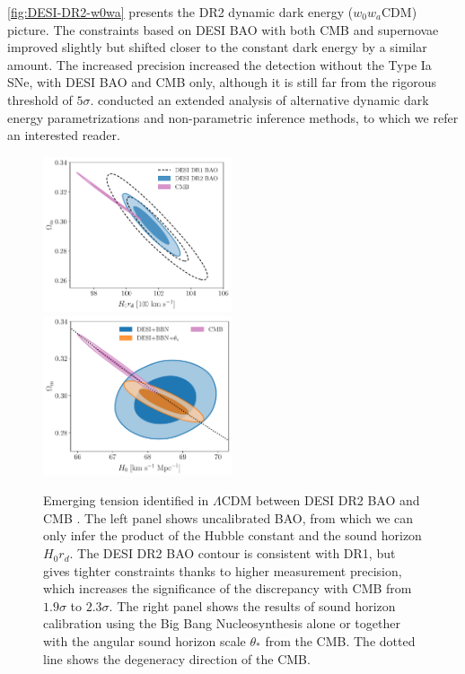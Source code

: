 \cref{fig:DESI-DR2-w0wa} presents the DR2 dynamic dark energy ($w_0w_a$CDM) picture.
The constraints based on DESI BAO with both CMB and supernovae improved slightly but shifted closer to the constant dark energy by a similar amount.
The increased precision increased the detection without the Type Ia SNe, with DESI BAO and CMB only, although it is still far from the rigorous threshold of $5\sigma$.
\cite{Y3.cpe-s1.Lodha.2025} conducted an extended analysis of alternative dynamic dark energy parametrizations and non-parametric inference methods, to which we refer an interested reader.

\begin{figure}[htbp]
    \centering
    \includegraphics[width=0.495\textwidth]{DR2/LCDM_BAO_v4.pdf}
    \includegraphics[width=0.495\textwidth]{DR2/LCDM_DESI_calibrated_v4.pdf}
    \caption[Emerging tension identified in $\Lambda$CDM between DESI DR2 BAO and CMB]{Emerging tension identified in $\Lambda$CDM between DESI DR2 BAO and CMB \citep[figures reproduced from][]{DESI.DR2.BAO.cosmo}.
    The left panel shows uncalibrated BAO, from which we can only infer the product of the Hubble constant and the sound horizon $H_0 r_d$.
    The DESI DR2 BAO contour is consistent with DR1, but gives tighter constraints thanks to higher measurement precision, which increases the significance of the discrepancy with CMB from $1.9\sigma$ to $2.3\sigma$.
    The right panel shows the results of sound horizon calibration using the Big Bang Nucleosynthesis \citep[BBN,][]{BBN-2024} alone or together with the angular sound horizon scale $\theta_*$ from the CMB.
    The dotted line shows the degeneracy direction of the CMB.}
    \label{fig:DESI-DR2-LCDM}
\end{figure}

